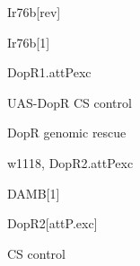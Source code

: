 \documentclass[17pt]{extarticle}
\begin{document}
\newpage{}
\vspace*{\fill}\begin{large}
Ir76b[rev] \\[0.5em]
\end{large}
\footnotesize
\vspace*{\fill}
\newpage{}
\vspace*{\fill}\begin{large}
Ir76b[1] \\[0.5em]
\end{large}
\footnotesize
\vspace*{\fill}
\newpage{}
\vspace*{\fill}\begin{normalsize}
DopR1.attPexc \\[0.5em]
\end{normalsize}
\footnotesize
\vspace*{\fill}
\newpage{}
\vspace*{\fill}\begin{small}
UAS-DopR CS control \\[0.5em]
\end{small}
\footnotesize
\vspace*{\fill}
\newpage{}
\vspace*{\fill}\begin{small}
DopR genomic rescue \\[0.5em]
\end{small}
\footnotesize
\vspace*{\fill}
\newpage{}
\vspace*{\fill}\begin{small}
w1118, DopR2.attPexc \\[0.5em]
\end{small}
\footnotesize
\vspace*{\fill}
\newpage{}
\vspace*{\fill}\begin{large}
DAMB[1] \\[0.5em]
\end{large}
\footnotesize
\vspace*{\fill}
\newpage{}
\vspace*{\fill}\begin{normalsize}
DopR2[attP.exc] \\[0.5em]
\end{normalsize}
\footnotesize
\vspace*{\fill}
\newpage{}
\vspace*{\fill}\begin{large}
CS control \\[0.5em]
\end{large}
\end{document}
